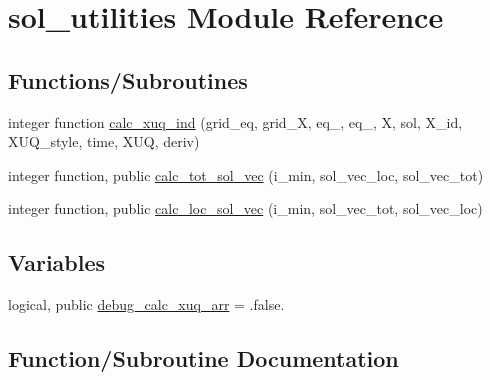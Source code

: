 \hypertarget{namespacesol__utilities}{}\section{sol\+\_\+utilities Module Reference}
\label{namespacesol__utilities}
\subsection*{Functions/\+Subroutines}
\begin{DoxyCompactItemize}
\item 
integer function \hyperlink{namespacesol__utilities_a687c87db78ca79ec617a4cfb7ed62f9e}{calc\+\_\+xuq\+\_\+ind} (grid\+\_\+eq, grid\+\_\+X, eq\+\_, eq\+\_, X, sol, X\+\_\+id, X\+U\+Q\+\_\+style, time, X\+UQ, deriv)
\item 
integer function, public \hyperlink{namespacesol__utilities_ad23f2a5293e2d7caf78be4d8fdf5a06d}{calc\+\_\+tot\+\_\+sol\+\_\+vec} (i\+\_\+min, sol\+\_\+vec\+\_\+loc, sol\+\_\+vec\+\_\+tot)
\item 
integer function, public \hyperlink{namespacesol__utilities_ab58942363de62344fba9faa1d3c95be5}{calc\+\_\+loc\+\_\+sol\+\_\+vec} (i\+\_\+min, sol\+\_\+vec\+\_\+tot, sol\+\_\+vec\+\_\+loc)
\end{DoxyCompactItemize}
\subsection*{Variables}
\begin{DoxyCompactItemize}
\item 
logical, public \hyperlink{namespacesol__utilities_a4779ff845b4ddc046892bf4eb4490dd2}{debug\+\_\+calc\+\_\+xuq\+\_\+arr} = .false.
\end{DoxyCompactItemize}


\subsection{Function/\+Subroutine Documentation}
\mbox{\label{namespacesol__utilities_ab58942363de62344fba9faa1d3c95be5}} 

